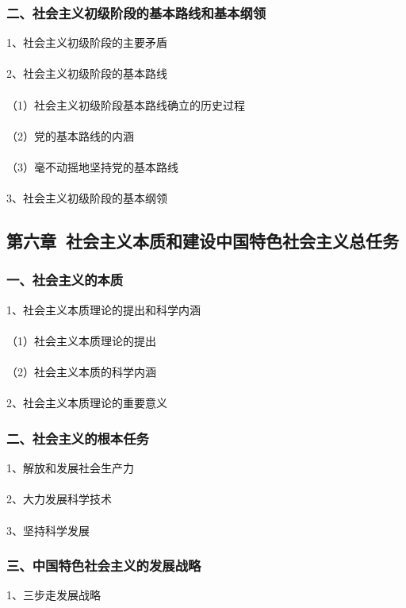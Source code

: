 \documentclass{ctexart}
\begin{document}
\subsubsection{二、社会主义初级阶段的基本路线和基本纲领}
1、社会主义初级阶段的主要矛盾
\\\\

2、社会主义初级阶段的基本路线
\\\\
（1）社会主义初级阶段基本路线确立的历史过程
\\\\
（2）党的基本路线的内涵
\\\\
（3）毫不动摇地坚持党的基本路线
\\\\

3、社会主义初级阶段的基本纲领

\subsection{第六章\ 社会主义本质和建设中国特色社会主义总任务}
\subsubsection{一、社会主义的本质}
1、社会主义本质理论的提出和科学内涵
\\\\
（1）社会主义本质理论的提出
\\\\
（2）社会主义本质的科学内涵
\\\\

2、社会主义本质理论的重要意义

\subsubsection{二、社会主义的根本任务}
1、解放和发展社会生产力
\\\\

2、大力发展科学技术
\\\\

3、坚持科学发展

\subsubsection{三、中国特色社会主义的发展战略}
1、三步走发展战略
\\\\
\end{document}
